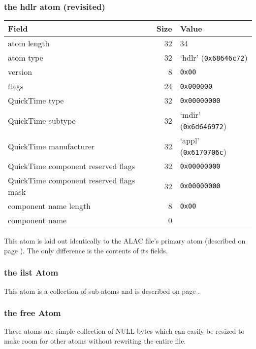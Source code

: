 \subsubsection{the hdlr atom (revisited)}

\begin{tabular}{|l|r|l|}
\hline
Field & Size & Value \\
\hline
atom length & 32 & 34 \\
atom type & 32 & `hdlr' (\texttt{0x68646c72}) \\
\hline
version & 8 & \texttt{0x00} \\
flags & 24 & \texttt{0x000000} \\
QuickTime type & 32 & \texttt{0x00000000} \\
QuickTime subtype & 32 & `mdir' (\texttt{0x6d646972}) \\
QuickTime manufacturer & 32 & `appl' (\texttt{0x6170706c}) \\
QuickTime component reserved flags & 32 & \texttt{0x00000000} \\
QuickTime component reserved flags mask & 32 & \texttt{0x00000000} \\
component name length & 8 & \texttt{0x00} \\
component name & 0 & \\
\hline
\end{tabular}

This atom is laid out identically to the ALAC file's primary
 atom (described on page \pageref{alac_hdlr}).
The only difference is the contents of its fields.

\subsubsection{the ilst Atom}

This atom is a collection of  sub-atoms
and is described on page \pageref{m4a_meta}.

\subsubsection{the free Atom}

These atoms are simple collection of NULL bytes which can easily be
resized to make room for other atoms without rewriting the entire file.

\clearpage


